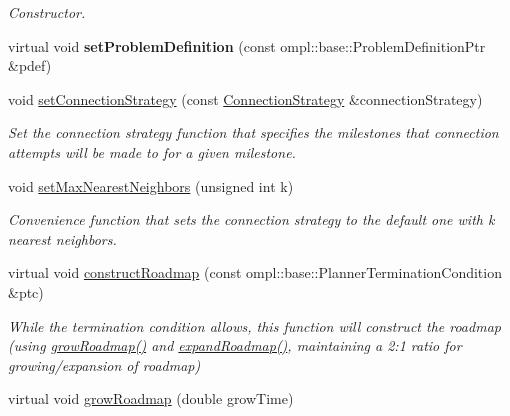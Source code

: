 \begin{DoxyCompactItemize}
\begin{DoxyCompactList}\small\item\em \-Constructor. \end{DoxyCompactList}\item 
\hypertarget{class_f_i_r_m_aeff5c0ced89bd2968b74693c2f7b5b5e}{virtual void {\bfseries set\-Problem\-Definition} (const ompl\-::base\-::\-Problem\-Definition\-Ptr \&pdef)}\label{class_f_i_r_m_aeff5c0ced89bd2968b74693c2f7b5b5e}

\item 
void \hyperlink{class_f_i_r_m_a8017d1847e682f39c2cbce33e904af57}{set\-Connection\-Strategy} (const \hyperlink{class_f_i_r_m_a15cfbcaf52c0bdd5e6c1a969bbf7ea1e}{\-Connection\-Strategy} \&connection\-Strategy)
\begin{DoxyCompactList}\small\item\em \-Set the connection strategy function that specifies the milestones that connection attempts will be made to for a given milestone. \end{DoxyCompactList}\item 
\hypertarget{class_f_i_r_m_a2a87b6c094c21b956a469a2b69cd387c}{void \hyperlink{class_f_i_r_m_a2a87b6c094c21b956a469a2b69cd387c}{set\-Max\-Nearest\-Neighbors} (unsigned int k)}\label{class_f_i_r_m_a2a87b6c094c21b956a469a2b69cd387c}

\begin{DoxyCompactList}\small\item\em \-Convenience function that sets the connection strategy to the default one with k nearest neighbors. \end{DoxyCompactList}\item 
\hypertarget{class_f_i_r_m_adc3bbc65d304168baaa5cce5f8fd8f86}{virtual void \hyperlink{class_f_i_r_m_adc3bbc65d304168baaa5cce5f8fd8f86}{construct\-Roadmap} (const ompl\-::base\-::\-Planner\-Termination\-Condition \&ptc)}\label{class_f_i_r_m_adc3bbc65d304168baaa5cce5f8fd8f86}

\begin{DoxyCompactList}\small\item\em \-While the termination condition allows, this function will construct the roadmap (using \hyperlink{class_f_i_r_m_a947186c6e6be0b513efe0e0b476fef88}{grow\-Roadmap()} and \hyperlink{class_f_i_r_m_ad9cd5472a8bd1b1fcb83763128f7fd75}{expand\-Roadmap()}, maintaining a 2\-:1 ratio for growing/expansion of roadmap) \end{DoxyCompactList}\item 
\hypertarget{class_f_i_r_m_a734b40c9cde0a238b252c7447595f12c}{virtual void \hyperlink{class_f_i_r_m_a734b40c9cde0a238b252c7447595f12c}{grow\-Roadmap} (double grow\-Time)}\label{class_f_i_r_m_a734b40c9cde0a238b252c7447595f12c}


\end{DoxyCompactItemize}
